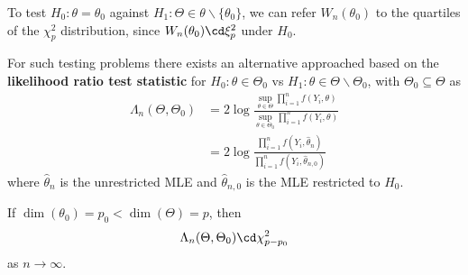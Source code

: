 To test $H_{0}: \theta = \theta_{0}$ against $H_{1}: \Theta \in \theta
\backslash \{ \theta_{0} \}$, we can refer $W_{n}(\theta_{0})$ to the
quartiles of the $\chi^{2}_{p}$ distribution, since $W_{n}(\theta_{0})
\cd \xi^{2}_{p}$ under $H_{0}$.

For such testing problems there exists an alternative approached based
on the \textbf{likelihood ratio test statistic} for $H_{0}: \theta \in
\Theta_{0}$ vs $H_{1}: \theta \in \Theta \backslash \Theta_{0}$, with
$\Theta_{0} \subseteq \Theta$ as
\begin{align}
  \label{eq:78}
  \Lambda_{n}(\Theta, \Theta_{0}) &= 2 \log \frac{\sup_{\theta \in \Theta}
    \prod_{i=1}^{n} f(Y_{i}, \theta)}{\sup_{\theta \in \Theta_{0}}
    \prod_{i=1}^{n} f(Y_{i}, \theta)} \\
  &= 2 \log \frac{\prod_{i=1}^{n} f(Y_{i}, \hat \theta_{n})}{\prod_{i=1}^{n}
    f(Y_{i}, \hat \theta_{n, 0})}
\end{align} where $\hat \theta_{n}$ is the unrestricted MLE and $\hat
\theta_{n, 0}$ is the MLE restricted to $H_{0}$.

\begin{thm}[Wilks']
  \label{defn:parametric_statistical_models:9}
  If $\dim(\theta_{0}) = p_{0} < \dim(\Theta) = p$, then
  \begin{equation}
    \label{eq:79}
    \Lambda_{n}(\Theta, \Theta_{0}) \cd \chi^{2}_{p - p_{0}}
  \end{equation} as $n \rightarrow \infty$.
\end{thm}


